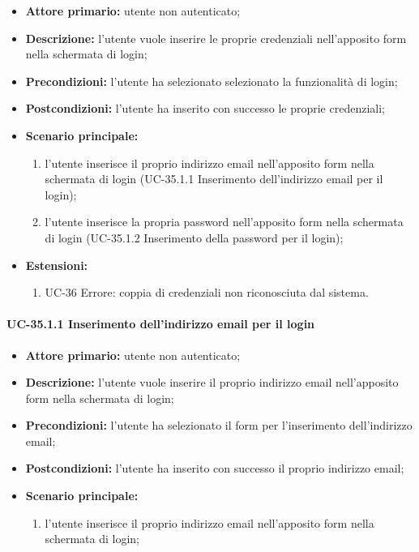 	\begin{itemize}
		\item \textbf{Attore primario:} utente non autenticato;

		\item \textbf{Descrizione:} l'utente vuole inserire le proprie credenziali nell'apposito form nella schermata di login;

		\item \textbf{Precondizioni:} l'utente ha selezionato selezionato la funzionalità di login;

		\item \textbf{Postcondizioni:} l'utente ha inserito con successo le proprie credenziali;

		\item \textbf{Scenario principale:}
	  		\begin{enumerate}
		  		\item l'utente inserisce il proprio indirizzo email nell'apposito form nella schermata di login (UC-35.1.1 Inserimento dell'indirizzo email per il login); 
		  		\item l'utente inserisce la propria password nell'apposito form nella schermata di login (UC-35.1.2 Inserimento della password per il login);
	  		\end{enumerate}
	    \item \textbf{Estensioni:}
	  		\begin{enumerate}
		  		\item UC-36 Errore: coppia di credenziali non riconosciuta dal sistema.
	  		\end{enumerate}
	\end{itemize}


\paragraph{UC-35.1.1 Inserimento dell'indirizzo email per il login}

	\begin{itemize}
		\item \textbf{Attore primario:} utente non autenticato;

		\item \textbf{Descrizione:} l'utente vuole inserire il proprio indirizzo email nell'apposito form nella schermata di login;

		\item \textbf{Precondizioni:} l'utente ha selezionato il form per l'inserimento dell'indirizzo email;

		\item \textbf{Postcondizioni:} l'utente ha inserito con successo il proprio indirizzo email;

		\item \textbf{Scenario principale:}
	  		\begin{enumerate}
		  		\item l'utente inserisce il proprio indirizzo email nell'apposito form nella schermata di login; 
	  		\end{enumerate}
	\end{itemize}

